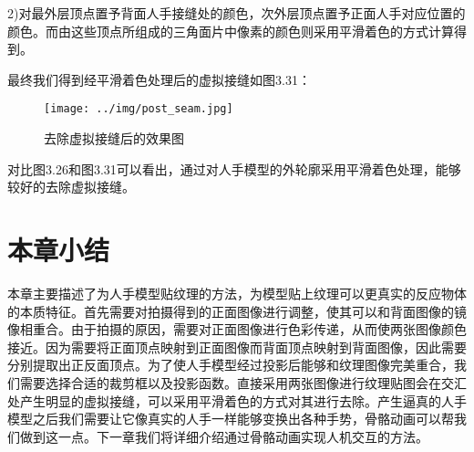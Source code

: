 2)对最外层顶点置予背面人手接缝处的颜色，次外层顶点置予正面人手对应位置的颜色。而由这些顶点所组成的三角面片中像素的颜色则采用平滑着色的方式计算得到。

最终我们得到经平滑着色处理后的虚拟接缝如图3.31：
\begin{figure}[htb]
\centering
\texttt{[image: ../img/post\_seam.jpg]}
\caption{去除虚拟接缝后的效果图}
\label{fig：graph}
\end{figure} 

对比图3.26和图3.31可以看出，通过对人手模型的外轮廓采用平滑着色处理，能够较好的去除虚拟接缝。

\section{本章小结}
本章主要描述了为人手模型贴纹理的方法，为模型贴上纹理可以更真实的反应物体的本质特征。首先需要对拍摄得到的正面图像进行调整，使其可以和背面图像的镜像相重合。由于拍摄的原因，需要对正面图像进行色彩传递，从而使两张图像颜色接近。因为需要将正面顶点映射到正面图像而背面顶点映射到背面图像，因此需要分别提取出正反面顶点。为了使人手模型经过投影后能够和纹理图像完美重合，我们需要选择合适的裁剪框以及投影函数。直接采用两张图像进行纹理贴图会在交汇处产生明显的虚拟接缝，可以采用平滑着色的方式对其进行去除。产生逼真的人手模型之后我们需要让它像真实的人手一样能够变换出各种手势，骨骼动画可以帮我们做到这一点。下一章我们将详细介绍通过骨骼动画实现人机交互的方法。










